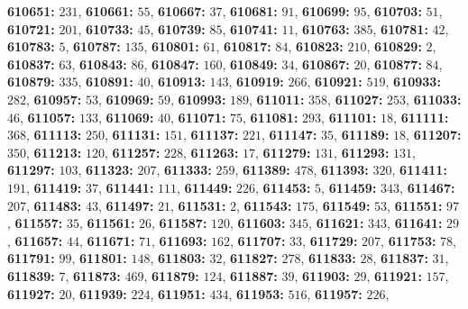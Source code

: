 \textsf{\bfseries 610651:} $231$, \textsf{\bfseries 610661:} $55$, \textsf{\bfseries 610667:} $37$, \textsf{\bfseries 610681:} $91$, \textsf{\bfseries 610699:} $95$, \textsf{\bfseries 610703:} $51$, \textsf{\bfseries 610721:} $201$, \textsf{\bfseries 610733:} $45$, \textsf{\bfseries 610739:} $85$, \textsf{\bfseries 610741:} $11$, \textsf{\bfseries 610763:} $385$, \textsf{\bfseries 610781:} $42$, \textsf{\bfseries 610783:} $5$, \textsf{\bfseries 610787:} $135$, \textsf{\bfseries 610801:} $61$, \textsf{\bfseries 610817:} $84$, \textsf{\bfseries 610823:} $210$, \textsf{\bfseries 610829:} $2$, \textsf{\bfseries 610837:} $63$, \textsf{\bfseries 610843:} $86$, \textsf{\bfseries 610847:} $160$, \textsf{\bfseries 610849:} $34$, \textsf{\bfseries 610867:} $20$, \textsf{\bfseries 610877:} $84$, \textsf{\bfseries 610879:} $335$, \textsf{\bfseries 610891:} $40$, \textsf{\bfseries 610913:} $143$, \textsf{\bfseries 610919:} $266$, \textsf{\bfseries 610921:} $519$, \textsf{\bfseries 610933:} $282$, \textsf{\bfseries 610957:} $53$, \textsf{\bfseries 610969:} $59$, \textsf{\bfseries 610993:} $189$, \textsf{\bfseries 611011:} $358$, \textsf{\bfseries 611027:} $253$, \textsf{\bfseries 611033:} $46$, \textsf{\bfseries 611057:} $133$, \textsf{\bfseries 611069:} $40$, \textsf{\bfseries 611071:} $75$, \textsf{\bfseries 611081:} $293$, \textsf{\bfseries 611101:} $18$, \textsf{\bfseries 611111:} $368$, \textsf{\bfseries 611113:} $250$, \textsf{\bfseries 611131:} $151$, \textsf{\bfseries 611137:} $221$, \textsf{\bfseries 611147:} $35$, \textsf{\bfseries 611189:} $18$, \textsf{\bfseries 611207:} $350$, \textsf{\bfseries 611213:} $120$, \textsf{\bfseries 611257:} $228$, \textsf{\bfseries 611263:} $17$, \textsf{\bfseries 611279:} $131$, \textsf{\bfseries 611293:} $131$, \textsf{\bfseries 611297:} $103$, \textsf{\bfseries 611323:} $207$, \textsf{\bfseries 611333:} $259$, \textsf{\bfseries 611389:} $478$, \textsf{\bfseries 611393:} $320$, \textsf{\bfseries 611411:} $191$, \textsf{\bfseries 611419:} $37$, \textsf{\bfseries 611441:} $111$, \textsf{\bfseries 611449:} $226$, \textsf{\bfseries 611453:} $5$, \textsf{\bfseries 611459:} $343$, \textsf{\bfseries 611467:} $207$, \textsf{\bfseries 611483:} $43$, \textsf{\bfseries 611497:} $21$, \textsf{\bfseries 611531:} $2$, \textsf{\bfseries 611543:} $175$, \textsf{\bfseries 611549:} $53$, \textsf{\bfseries 611551:} $97$, \textsf{\bfseries 611557:} $35$, \textsf{\bfseries 611561:} $26$, \textsf{\bfseries 611587:} $120$, \textsf{\bfseries 611603:} $345$, \textsf{\bfseries 611621:} $343$, \textsf{\bfseries 611641:} $29$, \textsf{\bfseries 611657:} $44$, \textsf{\bfseries 611671:} $71$, \textsf{\bfseries 611693:} $162$, \textsf{\bfseries 611707:} $33$, \textsf{\bfseries 611729:} $207$, \textsf{\bfseries 611753:} $78$, \textsf{\bfseries 611791:} $99$, \textsf{\bfseries 611801:} $148$, \textsf{\bfseries 611803:} $32$, \textsf{\bfseries 611827:} $278$, \textsf{\bfseries 611833:} $28$, \textsf{\bfseries 611837:} $31$, \textsf{\bfseries 611839:} $7$, \textsf{\bfseries 611873:} $469$, \textsf{\bfseries 611879:} $124$, \textsf{\bfseries 611887:} $39$, \textsf{\bfseries 611903:} $29$, \textsf{\bfseries 611921:} $157$, \textsf{\bfseries 611927:} $20$, \textsf{\bfseries 611939:} $224$, \textsf{\bfseries 611951:} $434$, \textsf{\bfseries 611953:} $516$, \textsf{\bfseries 611957:} $226$, 

